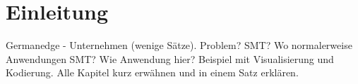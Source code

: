 \chapter{Einleitung}
\label{sec:Einleitung}

Germanedge - Unternehmen (wenige Sätze).
Problem?
SMT? Wo normalerweise Anwendungen SMT?
Wie Anwendung hier?
Beispiel mit Visualisierung und Kodierung.
Alle Kapitel kurz erwähnen und in einem Satz erklären.

